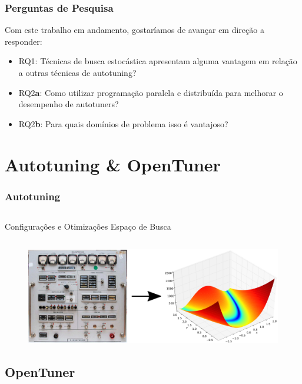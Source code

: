 \documentclass[10pt, compress]{beamer}
\begin{document}
\begin{frame}[fragile]
    \frametitle{Perguntas de Pesquisa}
    Com este trabalho em andamento, gostaríamos de avançar em
    direção a responder:
    \begin{itemize}
        \item \alert{RQ1}: Técnicas de busca estocástica apresentam
            alguma vantagem em relação a outras técnicas de autotuning?
        \item \alert{RQ2\textbf{a}}: Como utilizar programação paralela e
            distribuída para melhorar o desempenho de autotuners?
        \item \alert{RQ2\textbf{b}}: Para quais domínios de problema isso é
            vantajoso?
    \end{itemize}
\end{frame}

\section{Autotuning \& OpenTuner}

\begin{frame}[fragile]
    \frametitle{Autotuning}
    \begin{columns}
        \centering
        Configurações e Otimizações
        \centering
        Espaço de Busca
    \end{columns}
    \begin{figure}[H]
        \centering
        \includegraphics[width=1\textwidth]{autotuning}
    \end{figure}
\end{frame}

\subsection{OpenTuner}
\end{document}
